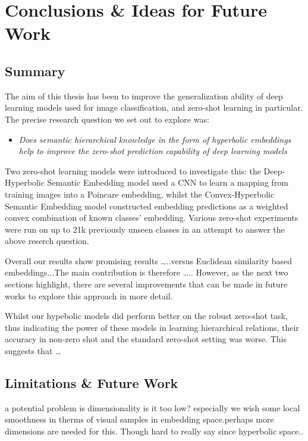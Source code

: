 \documentclass[12pt]{report}
\begin{document}
\newpage
\chapter{Conclusions \& Ideas for Future Work}

\section{Summary}
The aim of this thesis has been to improve the generalization ability of deep learning models used for image classification, and zero-shot learning in particular. The precise research question we set out to explore was: 
\begin{itemize}
\item \textit{Does semantic hierarchical knowledge in the form of hyperbolic embeddings help to improve the zero-shot prediction capability of deep learning models}
\end{itemize}
Two zero-shot learning models were introduced to investigate this: the Deep-Hyperbolic Semantic Embedding model used a CNN to learn a mapping from training images into a Poincare embedding, whilst the Convex-Hyperbolic Semantic Embedding model constructed embedding predictions as a weighted convex combination of known classes' embedding. Various zero-shot experiments were run on up to 21k previously unseen classes in an attempt to answer the above reserch question.

Overall our results show promising results \dots..versus Euclidean similarity based embeddings...The main contribution is therefore \dots.. However, as the next two sections highlight, there are several improvements that can be made in future works to explore this approach in more detail.

Whilst our hypebolic models did perform better on the robust zero-shot task, thus indicating the power of these models in learning hierarchical relations, their accuracy in non-zero shot and the standard zero-shot setting was worse. This suggests that \dots 

\section{Limitations \& Future Work}


a potential problem is dimensionality is it too low? especially we wish some local smoothness in therms of visual samples in embedding space.perhaps more dimensions are needed for this. Though hard to really say since hyperbolic space..
\end{document}
